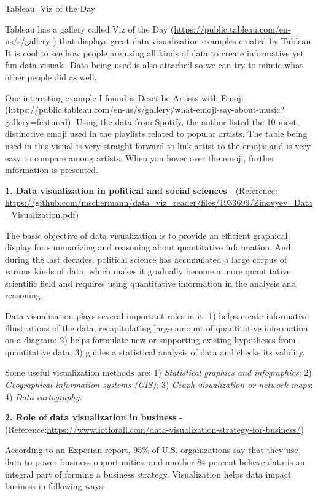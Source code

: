 \documentclass[]{book}
\theoremstyle{definition}
\theoremstyle{definition}
\theoremstyle{definition}
\theoremstyle{remark}
\begin{document}
Tableau: Viz of the Day

Tableau has a gallery called Viz of the Day
(\url{https://public.tableau.com/en-us/s/gallery} ) that displays great
data visualization examples created by Tableau. It is cool to see how
people are using all kinds of data to create informative yet fun data
visuals. Data being used is also attached so we can try to mimic what
other people did as well.

One interesting example I found is Describe Artists with Emoji
(\url{https://public.tableau.com/en-us/s/gallery/what-emoji-say-about-music?gallery=featured}).
Using the data from Spotify, the author listed the 10 most distinctive
emoji used in the playlists related to popular artists. The table being
used in this visual is very straight forward to link artist to the
emojis and is very easy to compare among artists. When you hover over
the emoji, further information is presented.

\textbf{1. Data visualization in political and social sciences} -
(Reference:
\url{https://github.com/mschermann/data_viz_reader/files/1933699/Zinovyev_Data_Visualization.pdf})

The basic objective of data visualization is to provide an efficient
graphical display for summarizing and reasoning about quantitative
information. And during the last decades, political science has
accumulated a large corpus of various kinds of data, which makes it
gradually become a more quantitative scientific field and requires using
quantitative information in the analysis and reasoning.

Data visualization plays several important roles in it: 1) helps create
informative illustrations of the data, recapitulating large amount of
quantitative information on a diagram; 2) helps formulate new or
supporting existing hypotheses from quantitative data; 3) guides a
statistical analysis of data and checks its validity.

Some useful visualization methods are: 1) \emph{Statistical graphics and
infographics}; 2) \emph{Geographical information systems (GIS)}; 3)
\emph{Graph visualization or network maps}; 4) \emph{Data cartography}.

\textbf{2. Role of data visualization in business}
-(Reference:\url{https://www.iotforall.com/data-visualization-strategy-for-business/})

According to an Experian report, 95\% of U.S. organizations say that
they use data to power business opportunities, and another 84 percent
believe data is an integral part of forming a business strategy.
Visualization helps data impact business in following ways:
\end{document}

